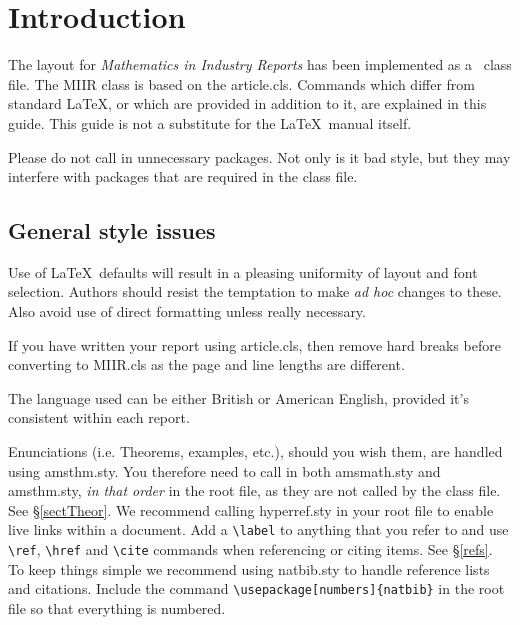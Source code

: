 \documentclass{MIIR}
\theoremstyle{plain}
\theoremstyle{definition}
\begin{document}




\maketitle



\section{Introduction}

The layout for \emph{Mathematics in Industry Reports} has been
implemented as a \LaTeXe\ class file. The MIIR class is based on the article.cls.
Commands which differ from  standard \LaTeX, or which are
provided in addition to it, are explained in this
guide. This guide is not a substitute for the \LaTeX\ manual itself.

Please do not call in unnecessary packages. Not only is it bad style,  but they may interfere with
packages that are required in the class file.


\subsection{General style issues}

Use of \LaTeX\ defaults will result in a pleasing uniformity of layout
and font selection. Authors should resist the temptation to make
\emph{ad hoc} changes to these. Also avoid use of direct formatting unless
really necessary. 

If you have written your report using article.cls, then remove hard breaks before converting to MIIR.cls
as the page and line lengths are different.

The language used 
can be either British or American English, provided it's consistent within each report.

Enunciations (i.e. Theorems, examples, etc.), should you wish them, are handled using amsthm.sty. You therefore need to call in both amsmath.sty and amsthm.sty, \emph{in that order} in the root file, as they are not called by the class file. 
See \S\ref{sectTheor}.
We recommend calling  hyperref.sty in your root file to enable live links within a document. Add a \verb"\label" to anything that you refer to and use \verb"\ref",  \verb"\href" and \verb"\cite"
commands when referencing or citing  items. See \S\ref{refs}.
To keep things simple we recommend using natbib.sty to handle reference lists and citations. Include the command \verb"\usepackage[numbers]{natbib}" in the root file so that everything is numbered.
\end{document}

